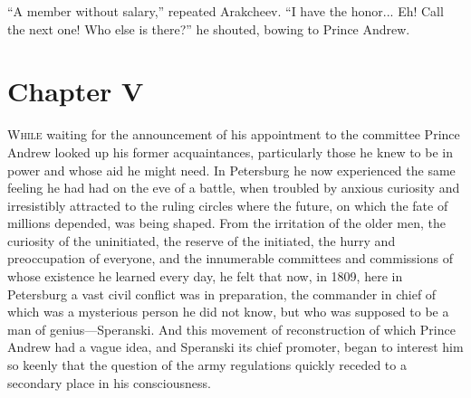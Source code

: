 ``A member without salary,'' repeated Arakcheev. ``I have the
honor... Eh!  Call the next one! Who else is there?'' he shouted,
bowing to Prince Andrew.


\chapter*{Chapter V}
\ifaudio     
{} 
\fi

\lettrine[lines=2, loversize=0.3, lraise=0]{\initfamily W}{hile}
waiting for the announcement of his appointment to the
committee Prince Andrew looked up his former acquaintances,
particularly those he knew to be in power and whose aid he might
need. In Petersburg he now experienced the same feeling he had
had on the eve of a battle, when troubled by anxious curiosity
and irresistibly attracted to the ruling circles where the
future, on which the fate of millions depended, was being
shaped. From the irritation of the older men, the curiosity of
the uninitiated, the reserve of the initiated, the hurry and
preoccupation of everyone, and the innumerable committees and
commissions of whose existence he learned every day, he felt that
now, in 1809, here in Petersburg a vast civil conflict was in
preparation, the commander in chief of which was a mysterious
person he did not know, but who was supposed to be a man of
genius---Speranski. And this movement of reconstruction of which
Prince Andrew had a vague idea, and Speranski its chief promoter,
began to interest him so keenly that the question of the army
regulations quickly receded to a secondary place in his
consciousness.


